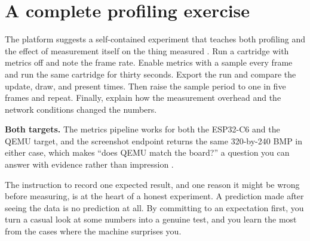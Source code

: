 

\section{A complete profiling exercise}

The platform suggests a self-contained experiment that teaches both profiling and
the effect of measurement itself on the thing measured \citep{prg32metrics}. Run a
cartridge with metrics off and note the frame rate. Enable metrics with a sample
every frame and run the same cartridge for thirty seconds. Export the run and
compare the update, draw, and present times. Then raise the sample period to one in
five frames and repeat. Finally, explain how the measurement overhead and the
network conditions changed the numbers.

\begin{prgtargets}
\textbf{Both targets.} The metrics pipeline works for both the ESP32\nobreakdash-C6 and the
QEMU target, and the screenshot endpoint returns the same 320-by-240 BMP in either
case, which makes ``does QEMU match the board?'' a question you can answer with
evidence rather than impression \citep{prg32qemu,prg32scimeasure}.
\end{prgtargets}

\begin{prgaside}
The instruction to record one expected result, and one reason it might be wrong
before measuring, is at the heart of a honest experiment. A
prediction made after seeing the data is no prediction at all. By committing to an
expectation first, you turn a casual look at some numbers into a genuine test, and
you learn the most from the cases where the machine surprises you.
\end{prgaside}
